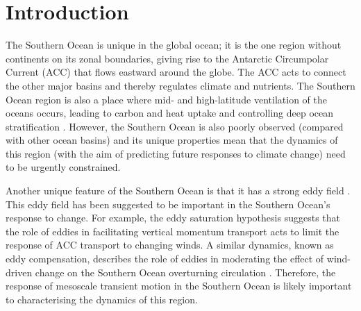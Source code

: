 \documentclass[linenumbers]{agujournal2019}
\begin{document}
%
%

\section{Introduction}

The Southern Ocean is unique in the global ocean; it is the one region without continents on its zonal boundaries, giving rise to the Antarctic Circumpolar Current (ACC) that flows eastward around the globe.
The ACC acts to connect the other major basins and thereby regulates climate and nutrients.
The Southern Ocean region is also a place where mid- and high-latitude ventilation of the oceans occurs, leading to carbon and heat uptake and controlling deep ocean stratification \citep{Rousselet2021, Morrison2022}.
However, the Southern Ocean is also poorly observed (compared with other ocean basins) and its unique properties mean that the dynamics of this region (with the aim of predicting future responses to climate change) need to be urgently constrained.

Another unique feature of the Southern Ocean is that it has a strong eddy field \citep{Fu2010}.
This eddy field has been suggested to be important in the Southern Ocean's response to change.
For example, the eddy saturation hypothesis \citep{Hallberg2006, Meredith-Hogg-2006, Munday2013, Constantinou2019} suggests that the role of eddies in facilitating vertical momentum transport acts to limit the response of ACC transport to changing winds.
A similar dynamics, known as eddy compensation, describes the role of eddies in moderating the effect of wind-driven change on the Southern Ocean overturning circulation \citep{Morrison2013a}.
Therefore, the response of mesoscale transient motion in the Southern Ocean is likely important to characterising the dynamics of this region.
\end{document}

